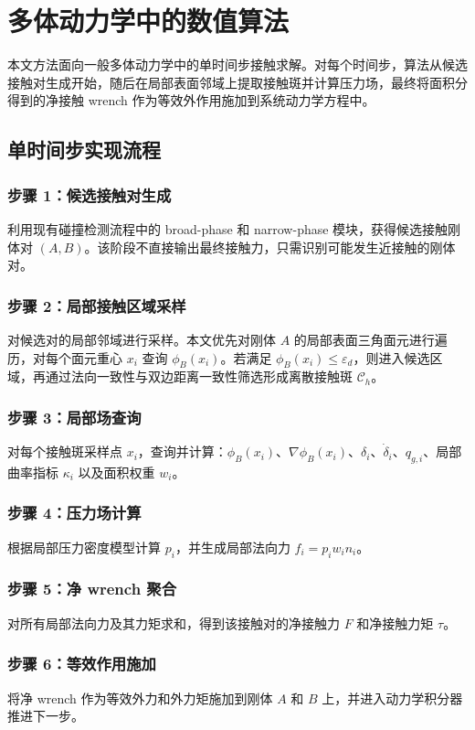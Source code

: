 \section{多体动力学中的数值算法}
本文方法面向一般多体动力学中的单时间步接触求解。对每个时间步，算法从候选接触对生成开始，随后在局部表面邻域上提取接触斑并计算压力场，最终将面积分得到的净接触 wrench 作为等效外作用施加到系统动力学方程中。

\subsection{单时间步实现流程}
\subsubsection*{步骤 1：候选接触对生成}
利用现有碰撞检测流程中的 broad-phase 和 narrow-phase 模块，获得候选接触刚体对 $(A,B)$。该阶段不直接输出最终接触力，只需识别可能发生近接触的刚体对。

\subsubsection*{步骤 2：局部接触区域采样}
对候选对的局部邻域进行采样。本文优先对刚体 $A$ 的局部表面三角面元进行遍历，对每个面元重心 $x_i$ 查询 $\phi_B(x_i)$。若满足 $\phi_B(x_i)\le \varepsilon_d$，则进入候选区域，再通过法向一致性与双边距离一致性筛选形成离散接触斑 $\mathcal{C}_h$。

\subsubsection*{步骤 3：局部场查询}
对每个接触斑采样点 $x_i$，查询并计算：$\phi_B(x_i)$、$\nabla \phi_B(x_i)$、$\delta_i$、$\dot{\delta}_i$、$q_{g,i}$、局部曲率指标 $\kappa_i$ 以及面积权重 $w_i$。

\subsubsection*{步骤 4：压力场计算}
根据局部压力密度模型计算 $p_i$，并生成局部法向力 $f_i=p_i w_i n_i$。

\subsubsection*{步骤 5：净 wrench 聚合}
对所有局部法向力及其力矩求和，得到该接触对的净接触力 $F$ 和净接触力矩 $\tau$。

\subsubsection*{步骤 6：等效作用施加}
将净 wrench 作为等效外力和外力矩施加到刚体 $A$ 和 $B$ 上，并进入动力学积分器推进下一步。

